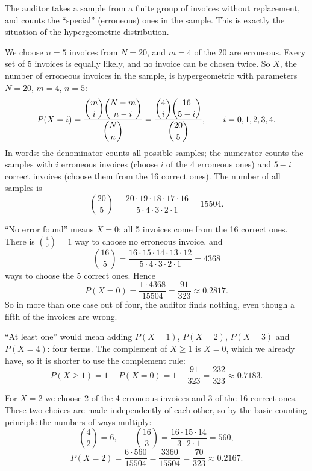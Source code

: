 \begin{solution}
	\idea The auditor takes a sample from a finite group of invoices without
	replacement, and counts the ``special'' (erroneous) ones in the sample. This
	is exactly the situation of the hypergeometric distribution.

	 We choose $n=5$ invoices from $N=20$, and $m=4$ of the 20 are
	erroneous. Every set of 5 invoices is equally likely, and no invoice can be
	chosen twice. So $X$, the number of erroneous invoices in the sample, is
	hypergeometric with parameters $N=20$, $m=4$, $n=5$:
	\[ P(X=i)=\frac{\dbinom{m}{i}\dbinom{N-m}{n-i}}{\dbinom{N}{n}}
		=\frac{\dbinom{4}{i}\dbinom{16}{5-i}}{\dbinom{20}{5}},
		\qquad i=0,1,2,3,4. \]
	In words: the denominator counts all possible samples; the numerator counts
	the samples with $i$ erroneous invoices (choose $i$ of the 4 erroneous ones)
	and $5-i$ correct invoices (choose them from the 16 correct ones). The
	number of all samples is
	\[ \binom{20}{5}=\frac{20\cdot19\cdot18\cdot17\cdot16}{5\cdot4\cdot3\cdot2\cdot1}=15504. \]

	 ``No error found'' means $X=0$: all 5 invoices come from the 16
	correct ones. There is $\binom40=1$ way to choose no erroneous invoice, and
	\[ \binom{16}{5}=\frac{16\cdot15\cdot14\cdot13\cdot12}{5\cdot4\cdot3\cdot2\cdot1}=4368 \]
	ways to choose the 5 correct ones. Hence
	\[ P(X=0)=\frac{1\cdot4368}{15504}=\frac{91}{323}\approx0.2817. \]
	So in more than one case out of four, the auditor finds nothing, even though
	a fifth of the invoices are wrong.

	 ``At least one'' would mean adding $P(X=1)$, $P(X=2)$, $P(X=3)$
	and $P(X=4)$: four terms. The complement of $X\ge1$ is $X=0$, which we
	already have, so it is shorter to use the complement rule:
	\[ P(X\ge1)=1-P(X=0)=1-\frac{91}{323}=\frac{232}{323}\approx0.7183. \]

	 For $X=2$ we choose 2 of the 4 erroneous invoices and 3 of the
	16 correct ones. These two choices are made independently of each other, so
	by the basic counting principle the numbers of ways multiply:
	\[ \binom42=6,\qquad \binom{16}{3}=\frac{16\cdot15\cdot14}{3\cdot2\cdot1}=560, \]
	\[ P(X=2)=\frac{6\cdot560}{15504}=\frac{3360}{15504}=\frac{70}{323}\approx0.2167. \]


\end{solution}
